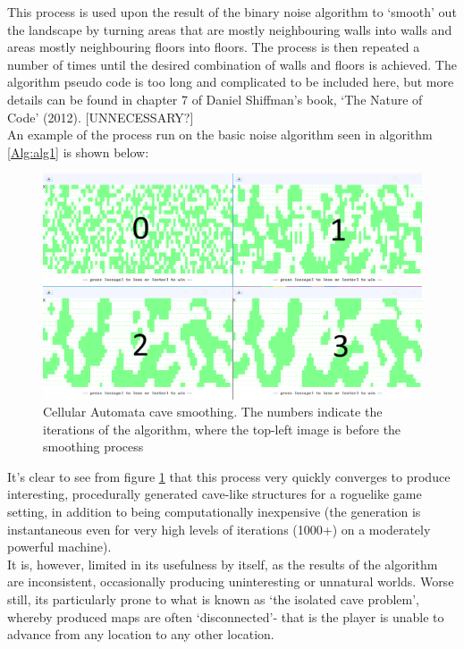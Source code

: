 \documentclass[12pt,a4paper]{article}
\begin{document}
This process is used upon the result of the binary noise algorithm to `smooth' out the landscape by turning areas that are mostly neighbouring walls into walls and areas mostly neighbouring floors into floors. The process is then repeated a number of times until the desired combination of walls and floors is achieved. The algorithm pseudo code is too long and complicated to be included here, but more details can be found in chapter 7 of Daniel Shiffman's book, `The Nature of Code' (2012). [UNNECESSARY?]\\

An example of the process run on the basic noise algorithm seen in algorithm \ref{Alg:alg1} is shown below:

\begin{figure}[h]
  \centering
 	\includegraphics[scale=0.5]{images/cellauto.png}
	\caption[]{Cellular Automata cave smoothing. The numbers indicate the iterations of the algorithm, where the top-left image is before the smoothing process}
	\label{fig:fig3}
\end{figure}

It's clear to see from figure \ref{fig:fig3} that this process very quickly converges to produce interesting, procedurally generated cave-like structures for a roguelike game setting, in addition to being computationally inexpensive (the generation is instantaneous even for very high levels of iterations (1000+) on a moderately powerful machine). \\

It is, however, limited in its usefulness by itself, as the results of the algorithm are inconsistent, occasionally producing uninteresting or unnatural worlds. Worse still, its particularly prone to what is known as `the isolated cave problem', whereby produced maps are often `disconnected'- that is the player is unable to advance from any location to any other location. 
\end{document}
